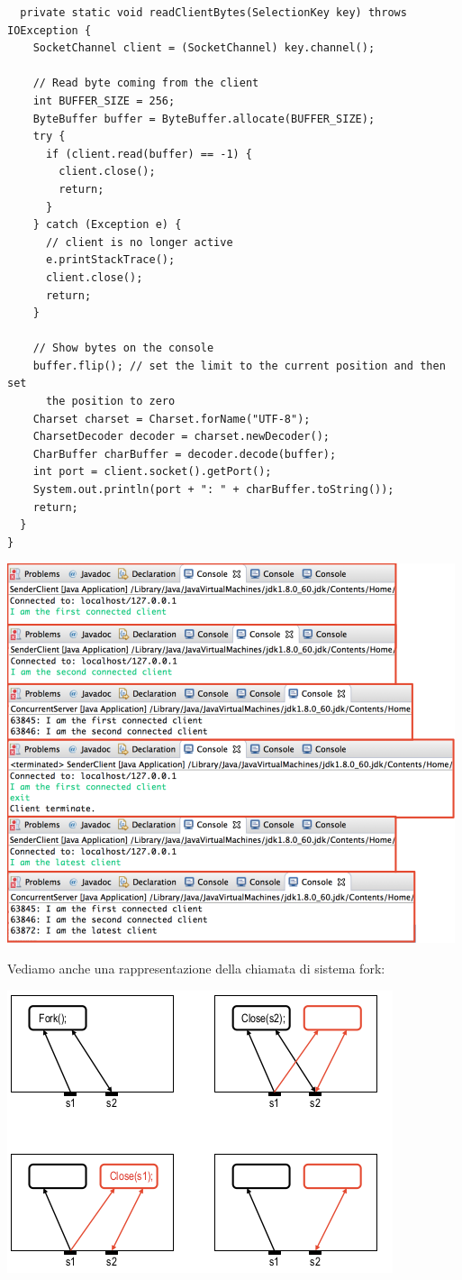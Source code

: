 \message{ !name(sd.tex)}\documentclass[a4paper,12pt, oneside]{book}
\begin{document}
\begin{verbatim}
  private static void readClientBytes(SelectionKey key) throws IOException {
    SocketChannel client = (SocketChannel) key.channel();

    // Read byte coming from the client
    int BUFFER_SIZE = 256;
    ByteBuffer buffer = ByteBuffer.allocate(BUFFER_SIZE);
    try {
      if (client.read(buffer) == -1) {
        client.close();
        return;
      }
    } catch (Exception e) {
      // client is no longer active
      e.printStackTrace();
      client.close();
      return;
    }

    // Show bytes on the console
    buffer.flip(); // set the limit to the current position and then set 
      the position to zero 
    Charset charset = Charset.forName("UTF-8");
    CharsetDecoder decoder = charset.newDecoder();
    CharBuffer charBuffer = decoder.decode(buffer);
    int port = client.socket().getPort();
    System.out.println(port + ": " + charBuffer.toString());
    return;
  }
}

\end{verbatim}
\begin{center}
	\includegraphics[scale=3]{img/conc5.png}
\end{center}
Vediamo anche una rappresentazione della chiamata di sistema fork:
\begin{center}
	\includegraphics[scale=0.7]{img/fork.png}
\end{center}
\end{document}
